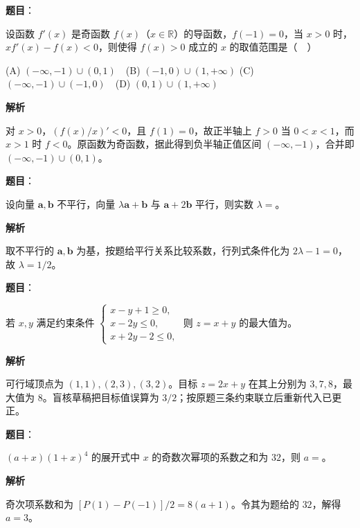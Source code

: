 \begin{answer}

\textbf{题目}：

设函数 $f'(x)$ 是奇函数 $f(x)$（$x\in\mathbb R$）的导函数，$f(-1)=0$，当 $x>0$ 时，$xf'(x)-f(x)<0$，则使得 $f(x)>0$ 成立的 $x$ 的取值范围是（　）

(A) $(-\infty,-1)\cup(0,1)$　(B) $(-1,0)\cup(1,+\infty)$  
(C) $(-\infty,-1)\cup(-1,0)$　(D) $(0,1)\cup(1,+\infty)$

\textbf{解析}

对 $x>0$，$(f(x)/x)'<0$，且 $f(1)=0$，故正半轴上 $f>0$ 当 $0<x<1$，而 $x>1$ 时 $f<0$。原函数为奇函数，据此得到负半轴正值区间 $(-\infty,-1)$，合并即 $(-\infty,-1)\cup(0,1)$。


\end{answer}
\begin{answer}

\textbf{题目}：

设向量 $\boldsymbol a,\boldsymbol b$ 不平行，向量 $\lambda\boldsymbol a+\boldsymbol b$ 与 $\boldsymbol a+2\boldsymbol b$ 平行，则实数 $\lambda=$\gkblank{}。

\textbf{解析}

取不平行的 $\boldsymbol a,\boldsymbol b$ 为基，按题给平行关系比较系数，行列式条件化为 $2\lambda-1=0$，故 $\lambda=1/2$。


\end{answer}
\begin{answer}

\textbf{题目}：

若 $x,y$ 满足约束条件 $\begin{cases}x-y+1\geqslant0,\\x-2y\leqslant0,\\x+2y-2\leqslant0,\end{cases}$ 则 $z=x+y$ 的最大值为\gkblank{}。

\textbf{解析}

可行域顶点为 $(1,1),(2,3),(3,2)$。目标 $z=2x+y$ 在其上分别为 $3,7,8$，最大值为 $8$。盲核草稿把目标值误算为 $3/2$；按原题三条约束联立后重新代入已更正。


\end{answer}
\begin{answer}

\textbf{题目}：

$(a+x)(1+x)^4$ 的展开式中 $x$ 的奇数次幂项的系数之和为 $32$，则 $a=$\gkblank{}。

\textbf{解析}

奇次项系数和为 $[P(1)-P(-1)]/2=8(a+1)$。令其为题给的 $32$，解得 $a=3$。


\end{answer}
